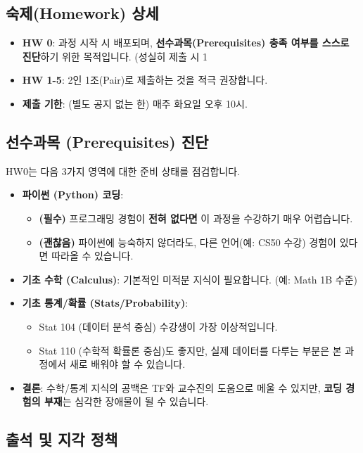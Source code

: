\documentclass[11pt,a4paper]{book}
\theoremstyle{definition}
\begin{document}
\subsection{숙제(Homework) 상세}
\begin{itemize}
    \item \textbf{HW 0}: 과정 시작 시 배포되며, \textbf{선수과목(Prerequisites) 충족 여부를 스스로 진단}하기 위한 목적입니다. (성실히 제출 시 1%
    \item \textbf{HW 1-5}: 2인 1조(Pair)로 제출하는 것을 적극 권장합니다.
    \item \textbf{제출 기한}: (별도 공지 없는 한) 매주 화요일 오후 10시.
\end{itemize}

\subsection{선수과목 (Prerequisites) 진단}
HW0는 다음 3가지 영역에 대한 준비 상태를 점검합니다.

\begin{itemize}
    \item \textbf{파이썬 (Python) 코딩}:
        \begin{itemize}
            \item \textbf{(필수)} 프로그래밍 경험이 \textbf{전혀 없다면} 이 과정을 수강하기 매우 어렵습니다.
            \item \textbf{(괜찮음)} 파이썬에 능숙하지 않더라도, 다른 언어(예: CS50 수강) 경험이 있다면 따라올 수 있습니다.
        \end{itemize}
    \item \textbf{기초 수학 (Calculus)}: 기본적인 미적분 지식이 필요합니다. (예: Math 1B 수준)
    \item \textbf{기초 통계/확률 (Stats/Probability)}:
        \begin{itemize}
            \item Stat 104 (데이터 분석 중심) 수강생이 가장 이상적입니다.
            \item Stat 110 (수학적 확률론 중심)도 좋지만, 실제 데이터를 다루는 부분은 본 과정에서 새로 배워야 할 수 있습니다.
        \end{itemize}
    \item \textbf{결론}: 수학/통계 지식의 공백은 TF와 교수진의 도움으로 메울 수 있지만, \textbf{코딩 경험의 부재}는 심각한 장애물이 될 수 있습니다.
\end{itemize}

\subsection{출석 및 지각 정책}
\end{document}
